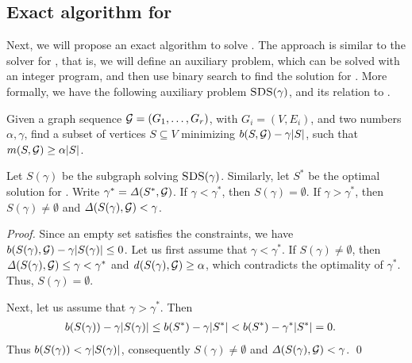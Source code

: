 \subsection{Exact algorithm for  \problemcdcsdiff}

Next, we will propose an exact algorithm to solve \problemcdcsdiff. The approach is similar to the solver for \problemcdcsm, that is, we will define an auxiliary problem, which can be solved with an integer program, and then use binary search to find the solution for \problemcdcsdiff. More formally, 
we have the following auxiliary problem  $\problemcdcsdiff(\gamma)$, and its relation to \problemcdcsdiff.

\begin{problem}[$\problemcdcsdiff(\gamma)$]
Given a graph sequence ${\mathcal G} = (G_1,\dots,G_r)$, with  $G_i = (V, E_i)$, and two numbers $\alpha, \gamma$, find a subset of vertices $S \subseteq V$ minimizing  $b(S, {\mathcal G}) - \gamma {\left|S\right|}$, such that $m(S, {\mathcal G}) \geq  \alpha{\left|S\right|}$.
\end{problem}

\begin{proposition}
\label{prop:fracsbs}
Let $S(\gamma)$  be the subgraph  solving $\problemcdcsdiff(\gamma)$. Similarly, let $S^*$  be the optimal solution for \problemcdcsdiff. Write $\gamma^* =  \diff{S^*, \calG}$. If $\gamma < \gamma^*$, then $S(\gamma) = \emptyset$. If $\gamma > \gamma^*$, then $S(\gamma) \neq \emptyset$ and $\diff{S(\gamma),  \calG} < \gamma$.
\end{proposition}

\begin{proof}
Since an empty set satisfies the constraints, we have
$b(S(\gamma), {\mathcal G}) - \gamma{\left|S(\gamma)\right|} \leq 0$.
Let us first assume that $\gamma < \gamma^*$. If $S(\gamma) \neq \emptyset$, then $\diff{S(\gamma),  \calG} \leq \gamma < \gamma^*$ and $\dens{S(\gamma), \calG} \geq \alpha$, which contradicts the optimality of $\gamma^*$. Thus, $S(\gamma) = \emptyset$.

Next, let us assume that $\gamma > \gamma^*$. Then
\[
\begin{split}
    b(S(\gamma)) - \gamma {\left|S(\gamma)\right|} & \leq b(S^*) - \gamma {\left|S^*\right|}  < b(S^*) - \gamma^* {\left|S^*\right|} = 0.
\end{split}
\]
Thus $b(S(\gamma)) <  \gamma {\left|S(\gamma)\right|}$, consequently  $S(\gamma) \neq \emptyset$ and $\diff{S(\gamma), \calG} < \gamma$. \qed
\end{proof}
 
